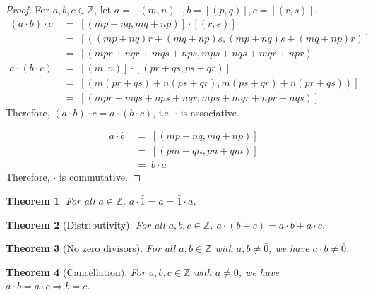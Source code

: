 \documentclass[10pt]{article}
\newtheorem{theorem}{Theorem}[section]
\theoremstyle{definition}
\theoremstyle{remark}
\begin{document}
\begin{proof}
                For $a,b,c \in \mathbb{Z}$, let $a = [(m, n)], b = [(p, q)], c = [(r, s)]$.
                \begin{align*}
                        (a\cdot b)\cdot c \;&=\; [(mp + nq, mq + np)] \cdot [(r, s)] \\
                                \;&=\; [((mp + nq)r + (mq + np)s, (mp + nq)s + (mq + np)r)]\\
                                \;&=\; [(mpr + nqr + mqs + nps, mps + nqs + mqr + npr)]\\
                        a\cdot (b\cdot c) \;&=\; [(m, n)] \cdot [(pr + qs, ps + qr)] \\
                                \;&=\; [(m(pr + qs) + n(ps + qr), m(ps + qr) + n(pr + qs))] \\
                                \;&=\; [(mpr + mqs + nps + nqr, mps + mqr + npr + nqs)]
                \end{align*}
                Therefore, $(a\cdot b)\cdot c = a\cdot (b\cdot c)$, i.e. $\cdot$ is associative.
                
                \begin{align*}
                        a\cdot b \;&=\; [(mp + nq, mq + np)] \\
                                \;&=\; [(pm + qn, pn + qm)] \\
                                \;&=\; b\cdot a
                \end{align*}
                Therefore, $\cdot$ is commutative.
                
        \end{proof}

        \begin{theorem}
                For all $a \in \mathbb{Z}$, $a\cdot\bar{1} = a = \bar{1}\cdot a$.
        \end{theorem}

        \begin{theorem}[Distributivity]
                For all $a,b,c \in \mathbb{Z}$, $a\cdot(b + c) = a\cdot b + a\cdot c$.
        \end{theorem}

        \begin{theorem}[No zero divisors]
                For all $a, b \in \mathbb{Z}$ with $a,b \neq \bar{0}$, we have $a\cdot b \neq \bar{0}$.
        \end{theorem}

        \begin{theorem}[Cancellation]
                For $a, b, c \in \mathbb{Z}$ with $a\neq \bar{0}$, we have $a\cdot b = a\cdot c
                \Rightarrow b = c$.
        \end{theorem}
        
\end{document}
